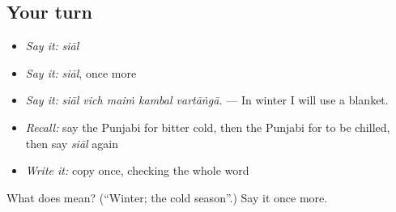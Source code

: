 \subsection*{Your turn}
\begin{itemize}
\raggedright
  \item \emph{Say it:} \emph{siāl}
  \item \emph{Say it:} \emph{siāl}, once more
  \item \emph{Say it:} \emph{siāl vich maiṁ kambal vartāṅgā.} — In winter I will use a blanket.
  \item \emph{Recall:} say the Punjabi for bitter cold, then the Punjabi for to be chilled, then say \emph{siāl} again
  \item \emph{Write it:} copy \textbf{} once, checking the whole word
\end{itemize}

\begin{tcolorbox}[breakable,colback=teal!4,colframe=teal!35!black,title={Before you move on}]
What does  mean? (\textquotedblleft{}Winter; the cold season\textquotedblright{}.) Say it once more.
\end{tcolorbox}
